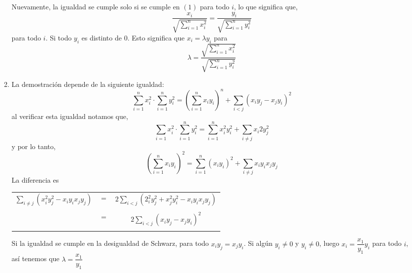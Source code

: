 \begin{enumerate}
\begin{enumerate}[\bfseries i)]
            Nuevamente, la igualdad se cumple solo si se cumple en $(1)$ para todo $i$, lo que significa que, 
            $$\dfrac{x_i}{\sqrt{\sum\limits_{i=1}^n x_i^2}} = \dfrac{y_i}{\sqrt{\sum\limits_{i=1}^n y_i^2}}$$
            para todo $i$. Si todo $y_i$ es distinto de $0$. Esto significa que $x_i=\lambda y_i$ para 
            $$\lambda = \dfrac{\sqrt{\sum\limits_{i=1}^n x_i^2}}{\sqrt{\sum\limits_{i=1}^n y_i^2}}$$
         \item La demostración depende de la siguiente igualdad:
            $$\sum\limits_{i=1}^n x_i^2 \cdot \sum\limits_{i=1}^n y_i^2 = \left( \sum\limits_{i=1}^n x_iy_i \right)^n + \sum\limits_{i<j} (x_i y_j -x_j y_i)^2$$
            al verificar esta igualdad notamos que,
            $$\sum\limits_{i=1}x_i^2 \cdot \sum\limits_{i=1}^n y_i^2 = \sum\limits_{i=1}^n x_i^2 y_i^2 + \sum\limits_{i\neq j} x_i2 y_j^2$$
             y por lo tanto,
             $$\left( \sum\limits_{i=1}^n x_i y_i \right)^2 = \sum\limits_{i=1}^n (x_i y_i)^2 + \sum\limits_{i\neq j} x_i y_i x_j y_j$$
             La diferencia es
             \begin{center} 
                \begin{tabular}{rlc}
                   $\sum\limits_{i \neq j} (x_i^2 y_j^2 - x_i y_i x_j y_j)$ & $=$ & $2 \sum\limits_{i<j} (2_i^2 y_j^2 + x_j^2 y_i^2 - x_i y_i x_j y_j)$\\\\
                      & $=$ & $2 \sum\limits_{i<j} (x_i y_j - x_j y_i)^2$\\\\
                \end{tabular}
             \end{center}
             Si la igualdad se cumple en la desigualdad de Schwarz, para todo $x_iy_j = x_j y_i$. Si algún $y_i \neq 0$ y $y_i \neq 0$, luego $x_i=\dfrac{x_1}{y_1}y_i$ para todo $i$, así tenemos que $\lambda = \dfrac{x_1}{y_1}$\\\\
      \end{enumerate}


\end{enumerate}
